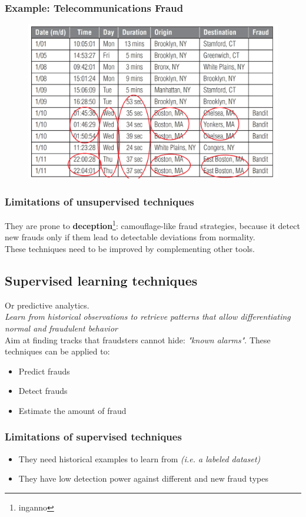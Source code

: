         \subsubsection{Example: Telecommunications Fraud}
            \begin{figure}[ht!]
                \centering
                \includegraphics[width=0.6\linewidth]{telecom.png}
            \end{figure}
        \subsubsection{Limitations of unsupervised techniques}
            They are prone to \textbf{deception}\footnote{inganno}: camouflage-like fraud strategies, because it detect new frauds only if them lead to detectable deviations from normality.\\
            These techniques need to be improved by complementing other tools.
    \subsection{Supervised learning techniques}
        Or predictive analytics.\\
        \textit{Learn from historical observations to retrieve patterns that allow differentiating normal and fraudulent behavior}\\
        Aim at finding tracks that fraudsters cannot hide: \textit{"known alarms"}.
        These techniques can be applied to:
        \begin{itemize}
            \item Predict frauds 
            \item Detect frauds 
            \item Estimate the amount of fraud 
        \end{itemize}
        \subsubsection{Limitations of supervised techniques}
            \begin{itemize}
                \item They need historical examples to learn from \textit{(i.e. a labeled dataset)}
                \item They have low detection power against different and new fraud types
            \end{itemize}
\newpage
